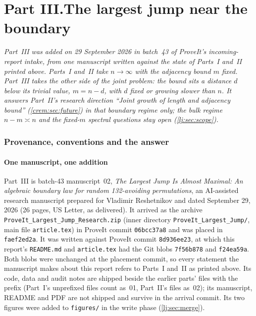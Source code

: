 \documentclass[11pt,a4paper]{article}
\theoremstyle{definition}\newaliascnt{definition}{theorem}
\theoremstyle{remark}\newaliascnt{remark}{theorem}
\begin{document}
\clearpage
{}\part*{Part III.\quad The largest jump near the boundary}

\noindent\emph{Part~III was added on 29 September 2026 in batch~43 of
ProveIt's incoming-report intake, from one manuscript written against the
state of Parts~I and~II printed above. Parts~I and~II take $n\to\infty$ with
the adjacency bound $m$ fixed. Part~III takes the other side of the joint
problem: the bound sits a distance $d$ below its trivial value, $m=n-d$, with
$d$ fixed or growing slower than $n$. It answers Part~II's research direction
``Joint growth of length and adjacency bound'' (\cref{crem:sec:future}) in
that boundary regime only; the bulk regime $n-m\asymp n$ and the fixed-$m$
spectral questions stay open (\cref{lj:sec:scope}).}

\section{Provenance, conventions and the answer}
\label{lj:sec:intro}

\subsection{One manuscript, one addition}
\label{lj:sec:source}
Part~III is batch-43 manuscript~02, \emph{The Largest Jump Is Almost
Maximal: An algebraic boundary law for random 132-avoiding permutations},
an AI-assisted research manuscript prepared for Vladimir Reshetnikov and
dated September 29, 2026 (26 pages, US Letter, as delivered). It arrived as
the archive \texttt{ProveIt\_Largest\_Jump\_Research.zip} (inner directory
\texttt{ProveIt\_Largest\_Jump/}, main file \texttt{article.tex}) in ProveIt
commit \texttt{06bcc37a8} and was placed in \texttt{faef2ed2a}. It was
written against ProveIt commit \texttt{8d936ee23}, at which this report's
\texttt{README.md} and \texttt{article.tex} had the Git blobs
\texttt{7f56b878} and \texttt{f24ea59a}. Both blobs were unchanged at the
placement commit, so every statement the manuscript makes about this report
refers to Parts~I and~II as printed above. Its code, data and audit notes are
shipped beside the earlier parts' files with the prefix
 (Part~I's unprefixed files count as~01, Part~II's
 files as~02); its manuscript, README and PDF are
not shipped and survive in the arrival commit. Its two figures were added to
\texttt{figures/} in the write phase (\cref{lj:sec:merge}).
\end{document}
